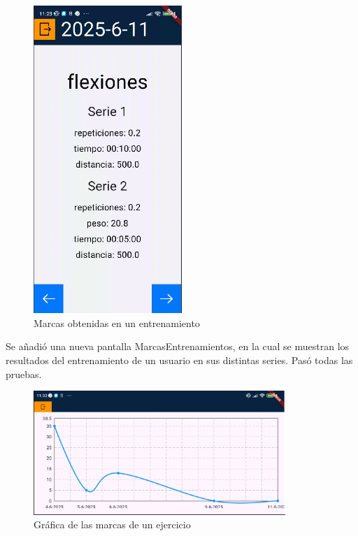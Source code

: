 \begin{figure}[H]
    \centering
    \includegraphics[width=0.5\textwidth]{pantallas/MarcasEntrenamiento.png}
    \caption{Marcas obtenidas en un entrenamiento}
    \label{fig:MarcasEntrenamiento}
\end{figure}

\hspace{0.5cm}

Se añadió una nueva pantalla MarcasEntrenamientos, en la cual se muestran los resultados del entrenamiento de un usuario en sus distintas series. Pasó todas las pruebas.

\hspace{0.5cm}


\hspace{0.5cm}

\begin{figure}[H]
    \centering
    \includegraphics[width=0.85\textwidth]{pantallas/Grafica.png}
    \caption{Gráfica de las marcas de un ejercicio}
    \label{fig:Grafica}
\end{figure}

